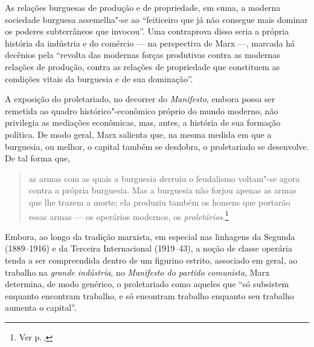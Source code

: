 As relações burguesas de produção e de propriedade, em suma, a moderna
sociedade burguesa assemelha"-se ao ``feiticeiro que já não consegue mais
dominar os poderes subterrâneos que invocou''. Uma contraprova disso
seria a própria história da indústria e do comércio --- na perspectiva de
Marx ---, marcada há decênios pela ``revolta das modernas forças
produtivas contra as modernas relações de produção, contra as relações
de propriedade que constituem as condições vitais da burguesia e de sua
dominação''.


A exposição do proletariado, no decorrer do \textit{Manifesto}, embora
possa ser remetida ao quadro histórico"-econômico próprio do mundo
moderno, não privilegia as mediações econômicas, mas, antes, a história
de sua formação política. De modo geral, Marx salienta que, na mesma
medida em que a burguesia, ou melhor, o capital também se desdobra, o
proletariado se desenvolve. De tal forma que,

\begin{quote} 
as armas com as quais a burguesia derruiu o feudalismo voltam"-se agora
contra a própria burguesia. Mas a burguesia não forjou apenas as armas que
lhe trazem a morte; ela produziu também os homens que portarão essas
armas --- os operários modernos, os \textit{proletários}.\footnote{Ver p.\,\pageref{4}.}
\end{quote} 

Embora, ao longo da tradição marxista, em especial nas linhagens da
Segunda (1889--1916) e da Terceira Internacional (1919--43), a noção de classe operária tenda
a ser compreendida dentro de um figurino estrito, associado em geral,
ao trabalho na \textit{grande indústria}, no \textit{Manifesto do partido
comunista}, Marx determina, de modo genérico, o proletariado como
aqueles que ``só subsistem enquanto encontram trabalho, e só encontram
trabalho enquanto seu trabalho aumenta o capital''. 

